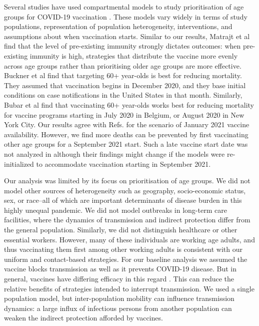 Several studies have used compartmental models to study prioritisation of age groups for COVID-19 vaccination \cite{bubar2020model,hoyt2020vaccine,matrajt2020vaccine}. These models vary widely in terms of study populations, representation of population heterogeneity, interventions, and assumptions about when vaccination starts. Similar to our results, Matrajt et al \cite{matrajt2020vaccine}  find that the level of pre-existing immunity strongly dictates outcomes: when pre-existing immunity is high, strategies that distribute the vaccine more evenly across age groups rather than prioritising older age groups are more effective. Buckner et al \cite{hoyt2020vaccine} find that targeting 60+ year-olds is best for reducing mortality. They assumed that vaccination begins in December 2020, and they base initial conditions on case notifications in the United States in that month. Similarly, Bubar et al \cite{bubar2020model} find that vaccinating 60+ year-olds works best for reducing mortality for vaccine programs starting in July 2020 in Belgium, or August 2020 in New York City. Our results agree with Refs. \cite{bubar2020model,hoyt2020vaccine} for the scenario of January 2021 vaccine availability. However, we find more deaths can be prevented by first vaccinating other age groups for a September 2021 start. Such a late vaccine start date was not analyzed in \cite{bubar2020model,hoyt2020vaccine} although their findings might change if the models were re-initialized to accommodate vaccination starting in September 2021. 

Our analysis was limited by its focus on prioritisation of age groups. We did not model other sources of heterogeneity such as geography, socio-economic status, sex, or race--all of which are important determinants of disease burden in this highly unequal pandemic. We did not model outbreaks in long-term care facilities, where the dynamics of transmission and indirect protection differ from the general population. Similarly, we did not distinguish healthcare or other essential workers. However, many of these individuals are working age adults, and thus vaccinating them first among other working adults is consistent with our uniform and contact-based strategies.  For our baseline analysis we assumed the vaccine blocks transmission as well as it prevents COVID-19 disease. But in general, vaccines have differing efficacy in this regard \cite{hodgson2020defines}. This can reduce the relative benefits of strategies intended to interrupt transmission.  We used a single population model, but inter-population mobility can influence transmission dynamics: a large influx of infectious persons from another population can weaken the indirect protection afforded by vaccines. 

